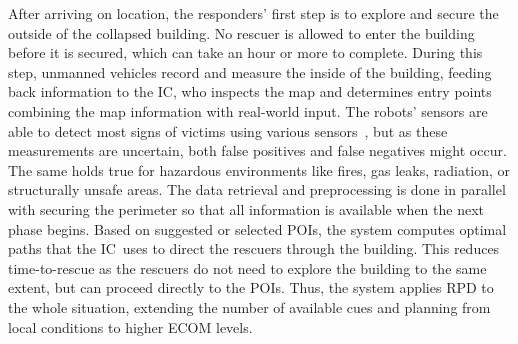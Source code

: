 \documentclass[conference,10pt,letter]{IEEEtran}
\def\IC{IC}
\begin{document}
%
%
After arriving on location, the responders' first step is to explore and secure the outside of the collapsed building. No rescuer is allowed to enter the building before it is secured, which can take an hour or more to complete. During this step, unmanned vehicles record and measure the inside of the building, feeding back information to the \IC , who inspects the map and determines entry points combining the map information with real-world input. The robots' sensors are able to detect most signs of victims using various sensors~\cite{Wu12Eulerian}, but as these measurements are uncertain, both false positives and false negatives might occur. The same holds true for hazardous environments like fires, gas leaks, radiation, or structurally unsafe areas. The data retrieval and preprocessing is done in parallel with securing the perimeter so that all information is available when the next phase begins. Based on suggested or selected POIs, the system computes optimal paths that the \IC\ uses to direct the rescuers through the building. This reduces time-to-rescue as the rescuers do not need to explore the building to the same extent, but can proceed directly to the POIs. Thus, the system applies RPD to the whole situation, extending the number of available cues and planning from local conditions to higher ECOM levels.
\end{document}
